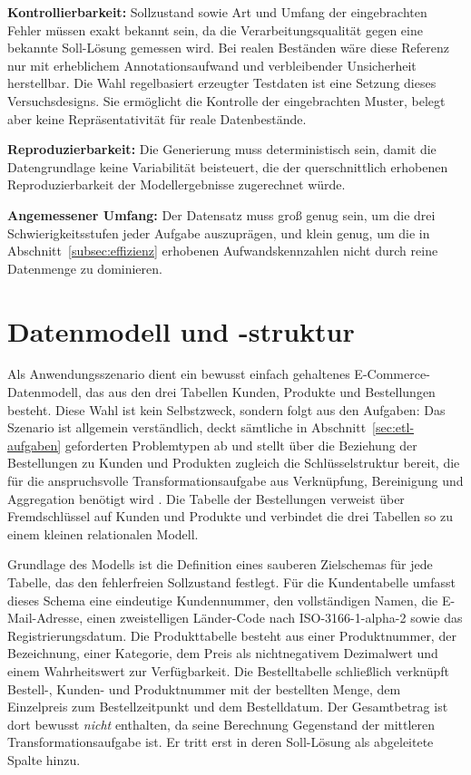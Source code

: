 \noindent\textbf{Kontrollierbarkeit:} Sollzustand sowie Art und Umfang der eingebrachten Fehler müssen exakt bekannt sein, da die Verarbeitungsqualität gegen eine bekannte Soll-Lösung gemessen wird. Bei realen Beständen wäre diese Referenz nur mit erheblichem Annotationsaufwand und verbleibender Unsicherheit herstellbar. Die Wahl regelbasiert erzeugter Testdaten ist eine Setzung dieses Versuchsdesigns. Sie ermöglicht die Kontrolle der eingebrachten Muster, belegt aber keine Repräsentativität für reale Datenbestände.

\noindent\textbf{Reproduzierbarkeit:} Die Generierung muss deterministisch sein, damit die Datengrundlage keine Variabilität beisteuert, die der querschnittlich erhobenen Reproduzierbarkeit der Modellergebnisse zugerechnet würde.

\noindent\textbf{Angemessener Umfang:} Der Datensatz muss groß genug sein, um die drei Schwierigkeitsstufen jeder Aufgabe auszuprägen, und klein genug, um die in Abschnitt~\ref{subsec:effizienz} erhobenen Aufwandskennzahlen nicht durch reine Datenmenge zu dominieren.

\section{Datenmodell und -struktur}
\label{sec:datenmodell}

Als Anwendungsszenario dient ein bewusst einfach gehaltenes E-Commerce-Datenmodell, das aus den drei Tabellen Kunden, Produkte und Bestellungen besteht. Diese Wahl ist kein Selbstzweck, sondern folgt aus den Aufgaben: Das Szenario ist allgemein verständlich, deckt sämtliche in Abschnitt~\ref{sec:etl-aufgaben} geforderten Problemtypen ab und stellt über die Beziehung der Bestellungen zu Kunden und Produkten zugleich die Schlüsselstruktur bereit, die für die anspruchsvolle Transformationsaufgabe aus Verknüpfung, Bereinigung und Aggregation benötigt wird \autocite{khanOverviewETLTechniques2024,walhaDataIntegrationTraditional2024}. Die Tabelle der Bestellungen verweist über Fremdschlüssel auf Kunden und Produkte und verbindet die drei Tabellen so zu einem kleinen relationalen Modell.

Grundlage des Modells ist die Definition eines sauberen Zielschemas für jede Tabelle, das den fehlerfreien Sollzustand festlegt. Für die Kundentabelle umfasst dieses Schema eine eindeutige Kundennummer, den vollständigen Namen, die E-Mail-Adresse, einen zweistelligen Länder-Code nach ISO-3166-1-alpha-2 sowie das Registrierungsdatum. Die Produkttabelle besteht aus einer Produktnummer, der Bezeichnung, einer Kategorie, dem Preis als nichtnegativem Dezimalwert und einem Wahrheitswert zur Verfügbarkeit. Die Bestelltabelle schließlich verknüpft Bestell-, Kunden- und Produktnummer mit der bestellten Menge, dem Einzelpreis zum Bestellzeitpunkt und dem Bestelldatum. Der Gesamtbetrag ist dort bewusst \emph{nicht} enthalten, da seine Berechnung Gegenstand der mittleren Transformationsaufgabe ist. Er tritt erst in deren Soll-Lösung als abgeleitete Spalte hinzu.

